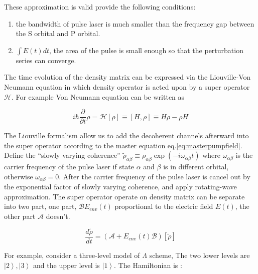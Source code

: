 \documentclass[11pt,a4paper]{article}
\begin{document}

These approximation is valid provide the following conditions:
\begin{enumerate}
  \setlength{\itemsep}{1pt}
  \setlength{\parskip}{0pt}
  \setlength{\parsep}{0pt}
\item the bandwidth of pulse laser is much smaller than the frequency gap between the S orbital and P orbital.
\item $\int E(t) dt$, the area of the pulse is small enough so that the perturbation series can converge.
\end{enumerate}

The time evolution of the density matrix can be expressed via the Liouville-Von Neumann equation in which density operator is acted upon by a super operator $\mathcal{H}$. For example Von Neumann equation can be written as

\begin{equation}
  i \hbar \frac{\partial}{\partial t}\rho = \mathcal{H}[\rho] \equiv [H,\rho] \equiv H\rho - \rho H
\end{equation}

The Liouville formalism allow us to add the decoherent channels afterward into the super operator according to the master equation eq.\ref{eq:masterpumpfield}.\\

Define the ``slowly varying coherence'' $\tilde{\rho}_{\alpha\beta} \equiv \rho_{\alpha\beta} \exp \left( -i \omega_{\alpha\beta} t \right)$ where $\omega_{\alpha\beta}$ is the carrier frequency of the pulse laser if state $\alpha$ and $\beta$ is in different orbital, otherwise $\omega_{\alpha\beta} = 0$. After the carrier frequency of the pulse laser is cancel out by the exponential factor of slowly varying coherence, and apply rotating-wave approximation. The super operator operate on density matrix can be separate into two part, one part, $\mathcal{B} E_{env} \left( t \right)$ proportional to the electric field $E \left( t \right)$, the other part $\mathcal{A}$ doesn't.

\begin{equation}
  \frac{d\tilde{\rho}}{dt} = \left( \mathcal{A} + E_{env}\left( t \right) \mathcal{B}\right) \left[  \tilde{\rho}\right]
\end{equation}

For example, consider a three-level model of $\Lambda$ scheme, The two lower levels are $\left| 2 \right\rangle,\left| 3 \right\rangle$ and the upper level is $\left| 1 \right\rangle$. The Hamiltonian is :\\
\end{document}
